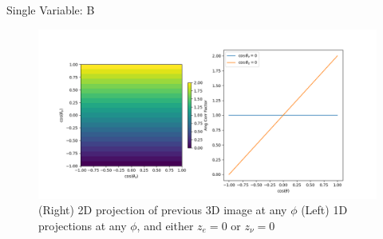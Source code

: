 \documentclass{beamer}
\begin{document}
\begin{frame}{Single Variable: B}
	\begin{figure}
		\centering
		\includegraphics[width=0.8\paperwidth]{plots/crosssections_B.png}
		\caption{(Right) 2D projection of previous 3D image at any $\phi$ (Left) 1D projections at any $\phi$, and either $z_e = 0$ or $z_\nu = 0$ }
	\end{figure}
\end{frame}
\end{document}
